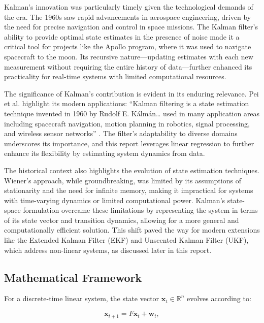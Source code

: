 \documentclass[12pt]{article}
\begin{document}
Kalman’s innovation was particularly timely given the technological demands of the era. The 1960s saw rapid advancements in aerospace engineering, driven by the need for precise navigation and control in space missions. The Kalman filter’s ability to provide optimal state estimates in the presence of noise made it a critical tool for projects like the Apollo program, where it was used to navigate spacecraft to the moon. Its recursive nature—updating estimates with each new measurement without requiring the entire history of data—further enhanced its practicality for real-time systems with limited computational resources.

The significance of Kalman’s contribution is evident in its enduring relevance. Pei et al. \cite{pei2019} highlight its modern applications: “Kalman filtering is a state estimation technique invented in 1960 by Rudolf E. Kálmán… used in many application areas including spacecraft navigation, motion planning in robotics, signal processing, and wireless sensor networks” \cite{pei2019}. The filter’s adaptability to diverse domains underscores its importance, and this report leverages linear regression to further enhance its flexibility by estimating system dynamics from data.

The historical context also highlights the evolution of state estimation techniques. Wiener’s approach, while groundbreaking, was limited by its assumptions of stationarity and the need for infinite memory, making it impractical for systems with time-varying dynamics or limited computational power. Kalman’s state-space formulation overcame these limitations by representing the system in terms of its state vector and transition dynamics, allowing for a more general and computationally efficient solution. This shift paved the way for modern extensions like the Extended Kalman Filter (EKF) and Unscented Kalman Filter (UKF), which address non-linear systems, as discussed later in this report.

\subsection{Mathematical Framework}
\label{subsec:math_framework}

For a discrete-time linear system, the state vector \( \mathbf{x}_t \in \mathbb{R}^n \) evolves according to:

\begin{equation}
    \mathbf{x}_{t+1} = F \mathbf{x}_t + \mathbf{w}_t,
    \label{eq:state_transition}
\end{equation}
\end{document}
